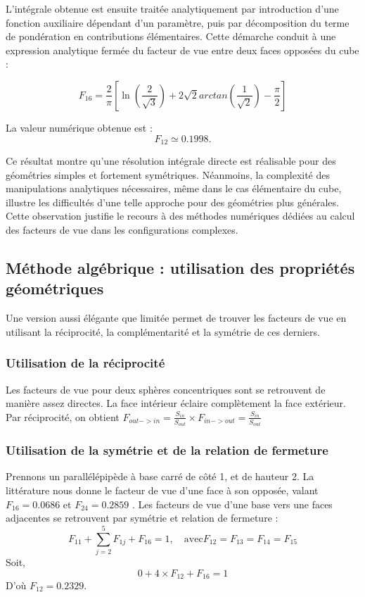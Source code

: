 L'intégrale obtenue est ensuite traitée analytiquement par introduction d'une fonction auxiliaire dépendant d'un paramètre, puis par décomposition du terme de pondération en contributions élémentaires. Cette démarche conduit à une expression analytique fermée du facteur de vue entre deux faces opposées du cube :

\begin{equation}
F_{16}=\frac{2}{\pi} \left[ \ln(\frac{2}{\sqrt{3}}) +2\sqrt{2}arctan(\frac{1}{\sqrt{2}})-\frac{\pi}{2} \right]
\end{equation}

La valeur numérique obtenue est :
\begin{equation}
F_{12}\simeq 0.1998.
\end{equation}

Ce résultat montre qu'une résolution intégrale directe est réalisable pour des géométries simples et fortement symétriques. Néanmoins, la complexité des manipulations analytiques nécessaires, même dans le cas élémentaire du cube, illustre les difficultés d'une telle approche pour des géométries plus générales. Cette observation justifie le recours à des méthodes numériques dédiées au calcul des facteurs de vue dans les configurations complexes.

\subsection{Méthode algébrique : utilisation des propriétés géométriques}
Une version aussi élégante que limitée permet de trouver les facteurs de vue en utilisant la réciprocité, la complémentarité et la symétrie de ces derniers.
\subsubsection*{Utilisation de la réciprocité}
Les facteurs de vue pour deux sphères concentriques sont se retrouvent de manière assez directes. La face intérieur éclaire complètement la face extérieur. Par réciprocité, on obtient $ F_{out->in} = \frac{S_{in}}{S_{out}} \times F_{in -> out}= \frac{S_{in}}{S_{out}}$  
\subsubsection*{Utilisation de la symétrie et de la relation de fermeture}
Prennons un parallélépipède à base carré de côté 1, et de hauteur 2. La littérature \cite{Howell} nous donne le facteur de vue d'une face à son opposée, valant $F_{16} = 0.0686$ et $F_{24} = 0.2859$ . Les facteurs de vue d'une base vers une faces adjacentes se retrouvent par symétrie et relation de fermeture :
\begin{equation}
F_{11} + \sum_{j=2}^5 F_{1j} + F_{16} = 1, \quad \text{avec}  F_{12} =  F_{13} = F_{14} = F_{15}
\end{equation}
Soit, 
\begin{equation}
0 + 4\times F_{12} + F_{16} = 1
\end{equation}
D'où $F_{12} = 0.2329$.


